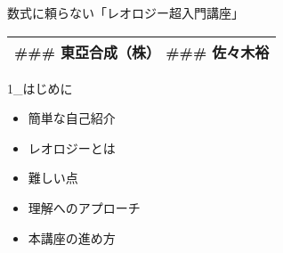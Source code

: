 \begin{frame}

\end{frame}

\begin{frame}{数式に頼らない「レオロジー超入門講座」}
\protect\hypertarget{ux6570ux5f0fux306bux983cux3089ux306aux3044-ux30ecux30aaux30edux30b8ux30fcux8d85ux5165ux9580ux8b1bux5ea7}{}

\begin{longtable}[]{@{}l@{}}
\toprule
\endhead
\begin{minipage}[t]{0.08\columnwidth}\raggedright
\#\#\# 東亞合成（株） \#\#\# 佐々木裕\strut
\end{minipage}\tabularnewline
\bottomrule
\end{longtable}

\end{frame}

\begin{frame}{1\_はじめに}
\protect\hypertarget{ux306fux3058ux3081ux306b}{}

\begin{itemize}
\tightlist
\item
  簡単な自己紹介
\item
  レオロジーとは
\item
  難しい点
\item
  理解へのアプローチ
\item
  本講座の進め方
\end{itemize}

\end{frame}

